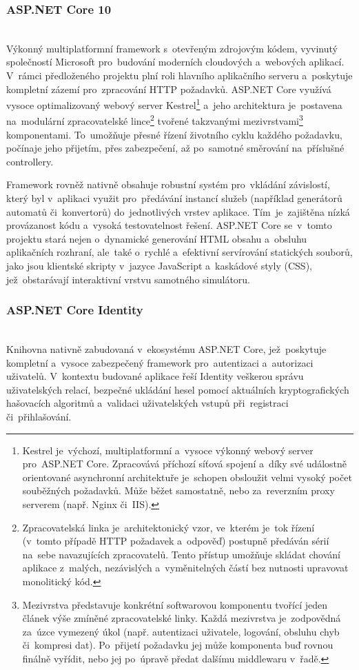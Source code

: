 \documentclass[
  master,
  program=ainfvs,
  printversion,
  figures=false,
  tables=false,
  glossaries,
  index
]{kidiplom}
\begin{document}
\subsubsection{ASP.NET Core 10} \mbox{} \\
Výkonný multiplatformní framework s~otevřeným zdrojovým kódem, vyvinutý společností Microsoft pro~budování moderních cloudových a~webových aplikací. V~rámci předloženého projektu plní roli hlavního aplikačního serveru a~poskytuje kompletní zázemí pro~zpracování HTTP požadavků. ASP.NET Core využívá vysoce optimalizovaný webový server Kestrel\footnote{Kestrel je~výchozí, multiplatformní a~vysoce výkonný webový server pro~ASP.NET Core. Zpracovává příchozí síťová spojení a~díky své událostně orientované asynchronní architektuře je~schopen obsloužit velmi vysoký počet souběžných požadavků. Může běžet samostatně, nebo za~reverzním proxy serverem (např. Nginx či~IIS).} a~jeho architektura je~postavena na~modulární zpracovatelské lince\footnote{Zpracovatelská linka je~architektonický vzor, ve~kterém je~tok řízení (v~tomto případě HTTP požadavek a~odpověď) postupně předáván sérií na~sebe navazujících zpracovatelů. Tento přístup umožňuje skládat chování aplikace z~malých, nezávislých a~vyměnitelných částí bez nutnosti upravovat monolitický kód.} tvořené takzvanými mezivrstvami\footnote{Mezivrstva představuje konkrétní softwarovou komponentu tvořící jeden článek výše zmíněné zpracovatelské linky. Každá mezivrstva je~zodpovědná za~úzce vymezený úkol (např. autentizaci uživatele, logování, obsluhu chyb či~kompresi dat). Po~přijetí požadavku jej může komponenta buď rovnou finálně vyřídit, nebo jej po~úpravě předat dalšímu middlewaru v~řadě.} komponentami. To~umožňuje přesné řízení životního cyklu každého požadavku, počínaje jeho přijetím, přes zabezpečení, až po~samotné směrování na~příslušné controllery.

Framework rovněž nativně obsahuje robustní systém pro~vkládání závislostí, který byl v~aplikaci využit pro~předávání instancí služeb (například generátorů automatů či~konvertorů) do~jednotlivých vrstev aplikace. Tím~je~zajištěna nízká provázanost kódu a~vysoká testovatelnost řešení. ASP.NET Core se~v~tomto projektu stará nejen o~dynamické generování HTML obsahu a~obsluhu aplikačních rozhraní, ale~také o~rychlé a~efektivní servírování statických souborů, jako jsou klientské skripty v~jazyce JavaScript a~kaskádové styly (CSS), jež~obstarávají interaktivní vrstvu samotného simulátoru.

\subsubsection{ASP.NET Core Identity} \mbox{} \\
Knihovna nativně zabudovaná v~ekosystému ASP.NET Core, jež~poskytuje kompletní a~vysoce zabezpečený framework pro~autentizaci a~autorizaci uživatelů. V~kontextu budované aplikace řeší Identity veškerou správu uživatelských relací, bezpečné ukládání hesel pomocí aktuálních kryptografických hašovacích algoritmů a~validaci uživatelských vstupů při~registraci či~přihlašování. 
\end{document}
